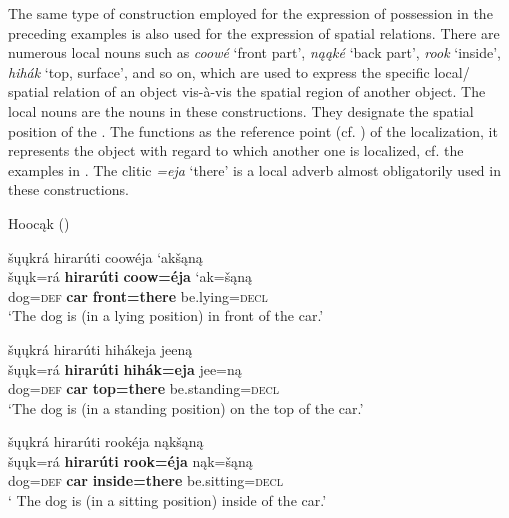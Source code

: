 \documentclass[output=paper]{LSP/langsci}
\begin{document}
The same type of construction employed for the expression of possession in the preceding examples is also used for the expression of spatial relations. There are numerous local nouns such as \textit{coow\'e}  `front part', \textit{n\k{a}\k{a}k\'e} `back part', \textit{rook} `inside', \textit{hihák} `top, surface', and so on, which are used to express the specific local/ spatial relation of an object vis-à-vis the spatial region of another object. The local nouns are the  nouns in these constructions. They designate the spatial position of the . The  functions as the reference point (cf. \citealt{Langacker1993}) of the localization, it represents the object with regard to which another one is localized, cf. the examples in . The clitic \textit{=eja} `there' is a local adverb almost obligatorily used in these constructions. 
 
\ea {}Hoocąk (\citealt[14]{Helmbrecht2003}) \label{dogposition}

\ea 
\glll \v{s}\k{u}\k{u}kr\'a hirar\'uti  coow\'eja `ak\v{s}\k{a}n\k{a}  \\
\v{s}\k{u}\k{u}k=r\'a \textbf{hirar\'uti}  \textbf{coow=\'eja} `ak=\v{s}\k{a}n\k{a} \\ 
dog=\textsc{def} \textbf{car} \textbf{front=there} be.lying=\textsc{decl} \\
\glt `The dog is (in a lying position) in front of the car.'

\ex 
\glll šųųkrá hirarúti hihákeja jeen\k{a}\\
\v{s}\k{u}\k{u}k=r\'a \textbf{hirar\'uti} \textbf{hih\'ak=eja} jee=n\k{a} \\
dog=\textsc{def}  \textbf{car} \textbf{top=there} be.standing=\textsc{decl} \\
\glt `The dog is (in a standing position) on the top of the car.'

\ex 
\glll šųųkrá hirarúti rookéja n\k{a}k\v{s}\k{a}n\k{a}\\
\v{s}\k{u}\k{u}k=r\'a   \textbf{hirar\'uti} \textbf{rook=\'eja} n\k{a}k=\v{s}\k{a}n\k{a} \\
dog=\textsc{def} \textbf{car} \textbf{inside=there} be.sitting=\textsc{decl} \\
\glt` The dog is (in a sitting position) inside of the car.'
\z
\z
\end{document}
